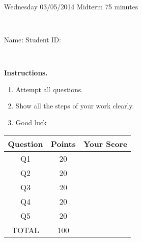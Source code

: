 \documentclass[12pt, oneside]{amsart}
\newcommand{\one}{20}
\newcommand{\two}{20}
\newcommand{\three}{20}
\newcommand{\four}{20}
\newcommand{\five}{20}
\begin{document}
%

\begin{center}
    \hrulefill\\
    {\bf \textsf{\raisebox{-0.10cm}{Spring 2014: MATH 285} \hspace{\fill} 
            \raisebox{-0.10cm}{Introduction to Applied Mathematics} \hspace{\fill}
            \raisebox{-0.10cm}{David Karapetyan}}}\\
    \hrulefill\\
    {\large \rule{0cm}{1.2cm} \textsf{Wednesday 03/05/2014} \hfill
        \textsf{Midterm} \hfill  \textsf{75 minutes}}\\
    {\large\rule{0cm}{1.2cm}\textsf{Name: \framebox[2.9in]{\rule{0cm}{0.8cm}} 
            \hspace{\fill}
            Student ID:\@\framebox[2.1in]{\rule{0cm}{0.8cm}}}}\\
\end{center}
\vspace{0.8cm}

\noindent
{\bf \textsf{Instructions.}}

\begin{enumerate}
    \item Attempt all questions.   
    \item Show all the steps of your work clearly.  
    \item Good luck 
\end{enumerate}

\vfill


\begin{center}
    {\large
        \begin{tabular}{|c|c|c|}
            \hline
            \rule[-0.3cm]{0cm}{1cm}
            \textsf{Question} & \textsf{Points} &  \textsf{Your Score} \\
            \hline
            \rule[-0.3cm]{0cm}{1cm}
            \textsf{Q1} & \one &\\
            \hline
            \rule[-0.3cm]{0cm}{1cm}
            \textsf{Q2} & \two &\\
            \hline
            \rule[-0.3cm]{0cm}{1cm}
            \textsf{Q3} & \three &\\
            \hline
            \rule[-0.3cm]{0cm}{1cm}
            \textsf{Q4} & \four &\\
            \hline
            \rule[-0.3cm]{0cm}{1cm}
            \textsf{Q5} & \five &\\
            \hline
            \rule[-0.3cm]{0cm}{1cm}

            \textsf{TOTAL} & 100 & \\
            \hline
        \end{tabular}
    } 

\end{center}
\end{document}
